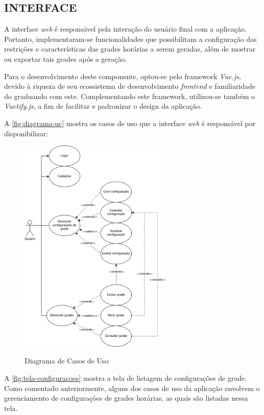 \subsection{INTERFACE}

A interface \textit{web} é responsável pela interação do usuário final com a aplicação. Portanto, implementaram-se funcionalidades que possibilitam a configuração das restrições e características das grades horárias a serem geradas, além de mostrar ou exportar tais grades após a geração.

Para o desenvolvimento deste componente, optou-se pelo framework \textit{Vue.js}, devido à riqueza de seu ecossistema de desenvolvimento \textit{frontend} e familiaridade do graduando com este. Complementando este framework, utilizou-se também o \textit{Vuetify.js}, a fim de facilitar e padronizar o design da aplicação.

A \autoref{fig:diagrama-uc} mostra os casos de uso que a interface \textit{web} é responsável por disponibilizar:

\begin{figure}[!htb]
	\centering
	\caption{Diagrama de Casos de Uso}
	\includegraphics[width=0.65\textwidth]{./dados/figuras/diagrama_uc}
	\label{fig:diagrama-uc}
\end{figure}
\newpage

A \autoref{fig:tela-configuracoes} mostra a tela de listagem de configurações de grade. Como comentado anteriormente, alguns dos casos de uso da aplicação envolvem o gerenciamento de configurações de grades horárias, as quais são listadas nessa tela.

